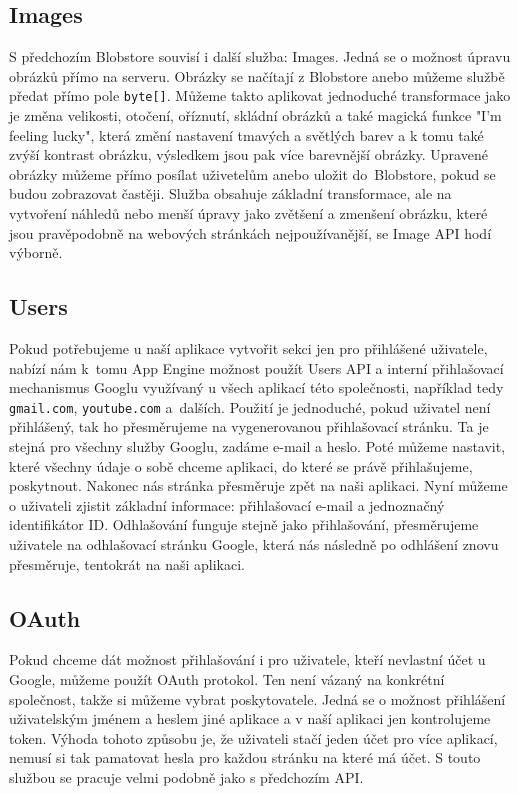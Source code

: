 \subsection{Images}
S předchozím Blobstore souvisí i další služba: Images. Jedná se o možnost úpravu obrázků přímo na serveru. Obrázky se načítají z Blobstore anebo můžeme službě předat přímo pole \verb|byte[]|. Můžeme takto aplikovat jednoduché transformace jako je změna velikosti, otočení, oříznutí, skládní obrázků a také magická funkce "I’m feeling lucky", která změní nastavení tmavých a světlých barev a k tomu také zvýší kontrast obrázku, výsledkem jsou pak více barevnější obrázky. Upravené obrázky můžeme přímo posílat uživetelům anebo uložit do~Blobstore, pokud se budou zobrazovat častěji. Služba obsahuje základní transformace, ale na vytvoření náhledů nebo menší úpravy jako zvětšení a zmenšení obrázku, které jsou pravěpodobně na webových stránkách nejpoužívanější, se Image API hodí výborně.

\subsection{Users}
Pokud potřebujeme u naší aplikace vytvořit sekci jen pro přihlášené uživatele, nabízí nám k~tomu App Engine možnost použít Users API a interní přihlašovací mechanismus Googlu využívaný u všech aplikací této společnosti, například tedy \verb|gmail.com|, \verb|youtube.com| a~dalších. Použití je jednoduché, pokud uživatel není přihlášený, tak ho přesměrujeme na vygenerovanou přihlašovací stránku. Ta je stejná pro všechny služby Googlu, zadáme e-mail a heslo. Poté můžeme nastavit, které všechny údaje o sobě chceme aplikaci, do které se právě přihlašujeme, poskytnout. Nakonec nás stránka přesměruje zpět na naši aplikaci. Nyní můžeme o uživateli zjistit základní informace: přihlašovací e-mail a jednoznačný identifikátor ID. Odhlašování funguje stejně jako přihlašování, přesměrujeme uživatele na odhlašovací stránku Google, která nás následně po odhlášení znovu přesměruje, tentokrát na naši aplikaci.

\subsection{OAuth}
Pokud chceme dát možnost přihlašování i pro uživatele, kteří nevlastní účet u Google, můžeme použít OAuth protokol. Ten není vázaný na konkrétní společnost, takže si můžeme vybrat poskytovatele. Jedná se o možnost přihlášení uživatelským jménem a heslem jiné aplikace a v naší aplikaci jen kontrolujeme token. Výhoda tohoto způsobu je, že uživateli stačí jeden účet pro více aplikací, nemusí si tak pamatovat hesla pro každou stránku na které má účet. S touto službou se pracuje velmi podobně jako s předchozím API.

